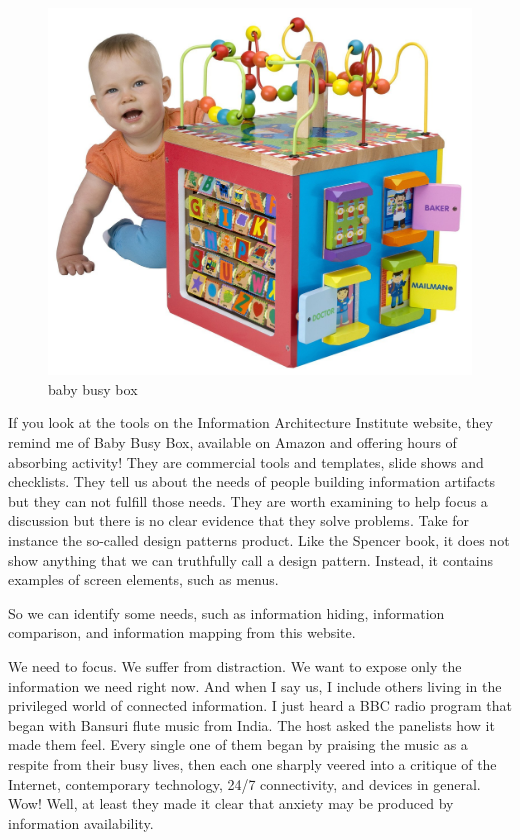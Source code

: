\begin{figure}
\centering
\includegraphics{./fiBusyBox.jpg}
\caption{baby busy box}
\end{figure}

If you look at the tools on the Information Architecture Institute
website, they remind me of Baby Busy Box, available on Amazon and
offering hours of absorbing activity! They are commercial tools and
templates, slide shows and checklists. They tell us about the needs of
people building information artifacts but they can not fulfill those
needs. They are worth examining to help focus a discussion but there is
no clear evidence that they solve problems. Take for instance the
so-called design patterns product. Like the Spencer book, it does not
show anything that we can truthfully call a design pattern. Instead, it
contains examples of screen elements, such as menus.

So we can identify some needs, such as information hiding, information
comparison, and information mapping from this website.

\hypertarget{information-hiding}{%
\label{information-hiding}}

We need to focus. We suffer from distraction. We want to expose only the
information we need right now. And when I say us, I include others
living in the privileged world of connected information. I just heard a
BBC radio program that began with Bansuri flute music from India. The
host asked the panelists how it made them feel. Every single one of them
began by praising the music as a respite from their busy lives, then
each one sharply veered into a critique of the Internet, contemporary
technology, 24/7 connectivity, and devices in general. Wow! Well, at
least they made it clear that anxiety may be produced by information
availability.

